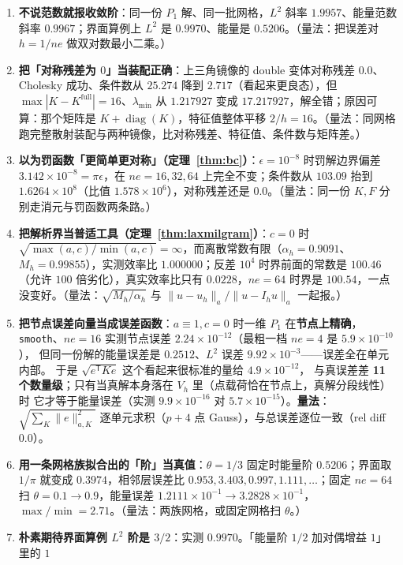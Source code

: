 \begin{enumerate}
  \item \textbf{不说范数就报收敛阶}：同一份 $P_1$ 解、同一批网格，$L^2$ 斜率 $1.9957$、能量范数斜率 $0.9967$；界面算例上 $L^2$ 是
  $0.9970$、能量是 $0.5206$。（量法：把误差对 $h=1/ne$ 做双对数最小二乘。）
  \item \textbf{把「对称残差为 $0$」当装配正确}：上三角镜像的 double 变体对称残差 $0.0$、Cholesky 成功、条件数从 $25.274$ 降到
  $2.717$（看起来更良态），但 $\max|K-K^{\text{full}}|=16$、$\lambda_{\min}$ 从 $1.217927$ 变成
  $17.217927$，解全错；原因可算：那个矩阵是 $K+\operatorname{diag}(K)$，特征值整体平移
  $2/h=16$。（量法：同网格跑完整散射装配与两种镜像，比对称残差、特征值、条件数与矩阵差。）
  \item \textbf{以为罚函数「更简单更对称」（定理~\ref{thm:bc}）}：$\epsilon=10^{-8}$ 时罚解边界偏差 $3.142\times10^{-8}=\pi\epsilon$，在
  $ne=16,32,64$ 上完全不变；条件数从 $103.09$ 抬到 $1.6264\times10^{8}$（比值 $1.578\times10^{6}$），对称残差还是
  $0.0$。（量法：同一份 $K,F$ 分别走消元与罚函数两条路。）
  \item \textbf{把解析界当普适工具（定理~\ref{thm:laxmilgram}）}：$c=0$ 时
  $\sqrt{\max(a,c)/\min(a,c)}=\infty$，而离散常数有限（$\alpha_h=0.9091$、$M_h=0.99855$），实测效率比
  $1.000000$；反差 $10^4$ 时界前面的常数是 $100.46$（允许 $100$ 倍劣化），真实效率比只有 $0.0228$，$ne=64$ 时界是
  $100.54$，一点没变好。（量法：$\sqrt{M_h/\alpha_h}$ 与 $\|u-u_h\|_a/\|u-I_hu\|_a$ 一起报。）
  \item \textbf{把节点误差向量当成误差函数}：$a\equiv1,c=0$ 时一维 $P_1$ 在\textbf{节点上精确}，
  \texttt{smooth}、$ne=16$ 实测节点误差 $2.24\times10^{-12}$（最粗一档 $ne=4$ 是 $5.9\times10^{-10}$），
  但同一份解的能量误差是 $0.2512$、$L^2$ 误差 $9.92\times10^{-3}$——误差全在单元内部。
  于是 $\sqrt{e^{\mathsf T}Ke}$ 这个看起来很标准的量给 $4.9\times10^{-12}$，
  与真误差差 \textbf{11 个数量级}；只有当真解本身落在 $V_h$ 里（点载荷恰在节点上，真解分段线性）时
  它才等于能量误差（实测 $9.9\times10^{-16}$ 对 $5.7\times10^{-15}$）。\textbf{量法}：
  $\sqrt{\sum_K\|e\|_{a,K}^2}$ 逐单元求积（$p+4$ 点 Gauss），与总误差逐位一致（rel diff $0.0$）。
  \item \textbf{用一条网格族拟合出的「阶」当真值}：$\theta=1/3$ 固定时能量阶 $0.5206$；界面取 $1/\pi$ 就变成 $0.3974$，相邻层误差比
  $0.953,3.403,0.997,1.111,\dots$；固定 $ne=64$ 扫 $\theta=0.1\to0.9$，能量误差
  $1.2111\times10^{-1}\to3.2828\times10^{-1}$，$\max/\min=2.71$。（量法：两族网格，或固定网格扫 $\theta$。）
  \item \textbf{朴素期待界面算例 $L^2$ 阶是 $3/2$}：实测 $0.9970$。「能量阶 $1/2$ 加对偶增益 $1$」里的 $1$

\end{enumerate}
